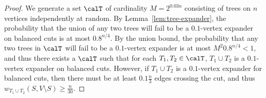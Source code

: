 \begin{proof}
    We generate a set $\calT$ of cardinality $M = 2^{0.03n}$ consisting of trees on $n$ vertices independently at random. By Lemma~\ref{lem:tree-expander}, the probability that the union of any two trees will fail to be a $0.1$-vertex expander on balanced cuts is at most $0.8^{n/4}$. By the union bound, the probability that any two trees in $\calT$ will fail to be a $0.1$-vertex expander is at most $M^2 0.8^{n/4} < 1$, and thus there exists a $\calT$ such that for each $T_1, T_2 \in \calT$, $T_1 \cup T_2$ is a $0.1$-vertex expander on balanced cuts. However, if $T_1 \cup T_2$ is a $0.1$-vertex expander for balanced cuts, then there must be at least $0.1 \frac{n}{3}$ edges crossing the cut, and thus $w_{T_1 \cup T_2}(S, V\setminus S) \geq \frac{n}{30}$.
\end{proof}


